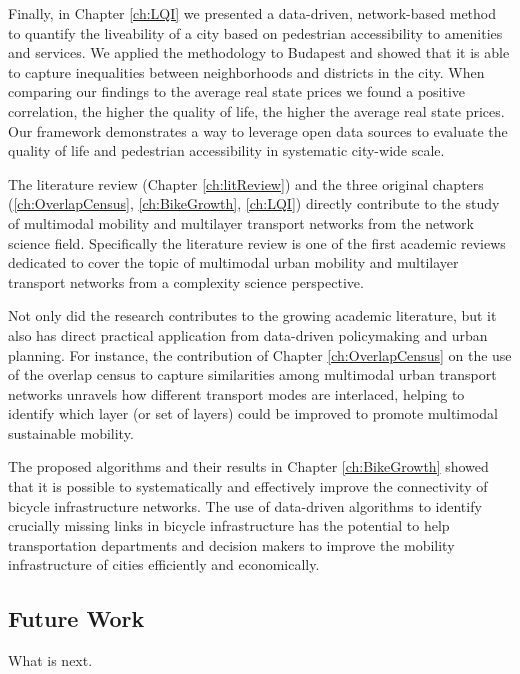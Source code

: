 Finally, in Chapter \ref{ch:LQI} we presented a data-driven, network-based method to quantify the liveability of a city based on pedestrian accessibility to amenities and services. We applied the methodology to Budapest and showed that it is able to capture inequalities between neighborhoods and districts in the city. When comparing our findings to the average real state prices we found a positive correlation, the higher the quality of life, the higher the average real state prices.    Our framework demonstrates a way to leverage open data sources to evaluate the quality of life and pedestrian accessibility in systematic city-wide scale.

The literature review (Chapter \ref{ch:litReview}) and the three original chapters (\ref{ch:OverlapCensus}, \ref{ch:BikeGrowth}, \ref{ch:LQI}) directly contribute to the study of multimodal mobility and multilayer transport networks from the network science field. Specifically the literature review is one of the first academic reviews dedicated to cover the topic of multimodal urban mobility and multilayer transport networks from a complexity science perspective.
 
Not only did the research contributes to the growing academic literature, but it also has direct practical application from data-driven policymaking and urban planning. For instance, the contribution of Chapter \ref{ch:OverlapCensus} on the use of the overlap census to capture similarities among multimodal urban transport networks unravels how different transport modes are interlaced, helping to identify which layer (or set of layers) could be improved to promote multimodal sustainable mobility.

The proposed algorithms and their results in Chapter \ref{ch:BikeGrowth} showed that it is possible to systematically and effectively improve the connectivity of bicycle infrastructure networks. The use of data-driven algorithms to identify crucially missing links in bicycle infrastructure has the potential to help transportation departments and decision makers to improve the mobility infrastructure of cities efficiently and economically. 

\subsection*{Future Work}
What is next.

